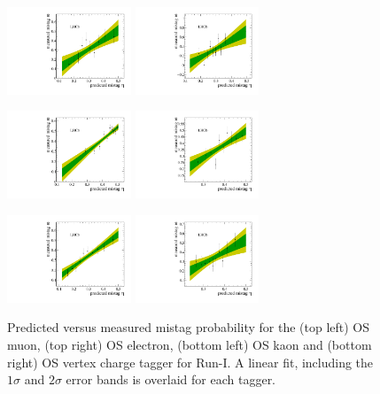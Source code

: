 \clearpage
\begin{figure}[h]
\centering
\includegraphics[height=!,width=0.33\textwidth]{figs/Tagging/Run1/OS_Muon_Calibration.pdf}
\includegraphics[height=!,width=0.33\textwidth]{figs/Tagging/Run1/OS_Electron_Calibration.pdf}

\includegraphics[height=!,width=0.33\textwidth]{figs/Tagging/Run1/OS_nnetKaon_Calibration.pdf}
\includegraphics[height=!,width=0.33\textwidth]{figs/Tagging/Run1/VtxCharge_Calibration.pdf}
\caption{\small Predicted versus measured mistag probability for the (top left) OS muon, (top right) OS electron, (bottom left) OS kaon and (bottom right) OS vertex charge tagger for Run-I. 
A linear fit, including the $1\sigma$ and $2\sigma$ error bands is overlaid for each tagger.}
\label{fig:OSdistribution_Run1}
%
\centering
\includegraphics[height=!,width=0.33\textwidth]{figs/Tagging/Run2/OS_Muon_Calibration.pdf}
\includegraphics[height=!,width=0.33\textwidth]{figs/Tagging/Run2/OS_Electron_Calibration.pdf}


\end{figure}
